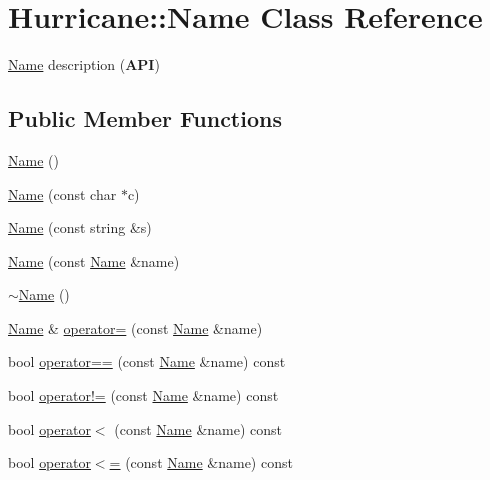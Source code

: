 \hypertarget{classHurricane_1_1Name}{}\section{Hurricane\+:\+:Name Class Reference}
\label{classHurricane_1_1Name}


\mbox{\hyperlink{classHurricane_1_1Name}{Name}} description ({\bfseries A\+PI})  


\subsection*{Public Member Functions}
\begin{DoxyCompactItemize}
\item 
\mbox{\hyperlink{classHurricane_1_1Name_a42636ecb0d4d7d03eb881420a244038b}{Name}} ()
\item 
\mbox{\hyperlink{classHurricane_1_1Name_a754d54199d54c5e4568421c89f0682cb}{Name}} (const char $\ast$c)
\item 
\mbox{\hyperlink{classHurricane_1_1Name_a446df795ebe2e641710696bf775eb491}{Name}} (const string \&s)
\item 
\mbox{\hyperlink{classHurricane_1_1Name_a56ffee3e75dc343c7ec8b61102c1d3a2}{Name}} (const \mbox{\hyperlink{classHurricane_1_1Name}{Name}} \&name)
\item 
\mbox{\hyperlink{classHurricane_1_1Name_a1ce605ce16980334f93d7cc278984842}{$\sim$\+Name}} ()
\item 
\mbox{\hyperlink{classHurricane_1_1Name}{Name}} \& \mbox{\hyperlink{classHurricane_1_1Name_adcd165de286782c011acc31727adb4a1}{operator=}} (const \mbox{\hyperlink{classHurricane_1_1Name}{Name}} \&name)
\item 
bool \mbox{\hyperlink{classHurricane_1_1Name_a3b728f0b8aa027639ebd47c60addf738}{operator==}} (const \mbox{\hyperlink{classHurricane_1_1Name}{Name}} \&name) const
\item 
bool \mbox{\hyperlink{classHurricane_1_1Name_aff97f0bcf698ad76f6f3c9a4c4833cc3}{operator!=}} (const \mbox{\hyperlink{classHurricane_1_1Name}{Name}} \&name) const
\item 
bool \mbox{\hyperlink{classHurricane_1_1Name_a9ce91a54cd340fb1e14baf56797f1577}{operator$<$}} (const \mbox{\hyperlink{classHurricane_1_1Name}{Name}} \&name) const
\item 
bool \mbox{\hyperlink{classHurricane_1_1Name_a9704f9fe4c605a86de13b6a8d90feab2}{operator$<$=}} (const \mbox{\hyperlink{classHurricane_1_1Name}{Name}} \&name) const

\end{DoxyCompactItemize}

